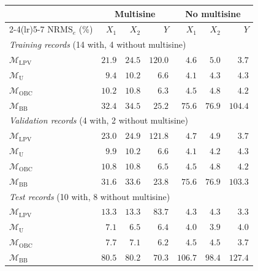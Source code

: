 \setlength{\tabcolsep}{3pt}
\begin{tabular}{l r r r r r r}
\toprule
 & \multicolumn{3}{c}{Multisine} & \multicolumn{3}{c}{No multisine}\\
\cmidrule(lr){2-4}\cmidrule(lr){5-7}
$\mathrm{NRMS}_e$ (\%) & $X_1$ & $X_2$ & $Y$ & $X_1$ & $X_2$ & $Y$\\
\midrule
\multicolumn{7}{l}{\emph{Training records} (14 with, 4 without multisine)}\\
$\mathcal{M}_{\mathrm{LPV}}$ & $21.9$ & $24.5$ & $120.0$ & $4.6$ & $5.0$ & $3.7$\\
$\mathcal{M}_{\mathrm{U}}$ & $9.4$ & $10.2$ & $6.6$ & $4.1$ & $4.3$ & $4.3$\\
$\mathcal{M}_{\mathrm{OBC}}$ & $10.2$ & $10.8$ & $6.3$ & $4.5$ & $4.8$ & $4.2$\\
$\mathcal{M}_{\mathrm{BB}}$ & $32.4$ & $34.5$ & $25.2$ & $75.6$ & $76.9$ & $104.4$\\
\midrule
\multicolumn{7}{l}{\emph{Validation records} (4 with, 2 without multisine)}\\
$\mathcal{M}_{\mathrm{LPV}}$ & $23.0$ & $24.9$ & $121.8$ & $4.7$ & $4.9$ & $3.7$\\
$\mathcal{M}_{\mathrm{U}}$ & $9.9$ & $10.2$ & $6.6$ & $4.1$ & $4.2$ & $4.3$\\
$\mathcal{M}_{\mathrm{OBC}}$ & $10.8$ & $10.8$ & $6.5$ & $4.5$ & $4.8$ & $4.2$\\
$\mathcal{M}_{\mathrm{BB}}$ & $31.6$ & $33.6$ & $23.8$ & $75.6$ & $76.9$ & $103.3$\\
\midrule
\multicolumn{7}{l}{\emph{Test records} (10 with, 8 without multisine)}\\
$\mathcal{M}_{\mathrm{LPV}}$ & $13.3$ & $13.3$ & $83.7$ & $4.3$ & $4.3$ & $3.3$\\
$\mathcal{M}_{\mathrm{U}}$ & $7.1$ & $6.5$ & $6.4$ & $4.0$ & $3.9$ & $4.0$\\
$\mathcal{M}_{\mathrm{OBC}}$ & $7.7$ & $7.1$ & $6.2$ & $4.5$ & $4.5$ & $3.7$\\
$\mathcal{M}_{\mathrm{BB}}$ & $80.5$ & $80.2$ & $70.3$ & $106.7$ & $98.4$ & $127.4$\\
\bottomrule
\end{tabular}
